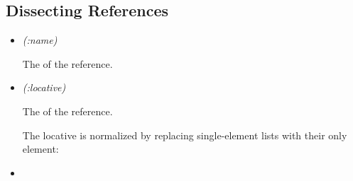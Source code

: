 \subsection{Dissecting References}\label{dissecting-references}

\label{x-28DREF-3A-40DISSECTING-REFERENCES-20MGL-PAX-3ASECTION-29}

\begin{itemize}
\item
  \label{x-28DREF-3AXREF-NAME-20-28MGL-PAX-3AREADER-20DREF-3AXREF-29-29}
  \emph{ (:name)}

  The
  of the reference.
\item
  \label{x-28DREF-3AXREF-LOCATIVE-20-28MGL-PAX-3AREADER-20DREF-3AXREF-29-29}
  \emph{ (:locative)}

  The
  of the reference.

  The locative is normalized by replacing single-element lists with
  their only element:

\begin{Shaded}
\begin{Highlighting}[]
 \NormalTok{)}
\end{Highlighting}
\end{Shaded}

\begin{Shaded}
\begin{Highlighting}[]
\NormalTok{ \textquotesingle{}(}\NormalTok{))}
\end{Highlighting}
\end{Shaded}
\item
  \label{x-28DREF-3ADREF-NAME-20-28MGL-PAX-3AREADER-20DREF-3ADREF-29-29}
  \emph{}


\end{itemize}
